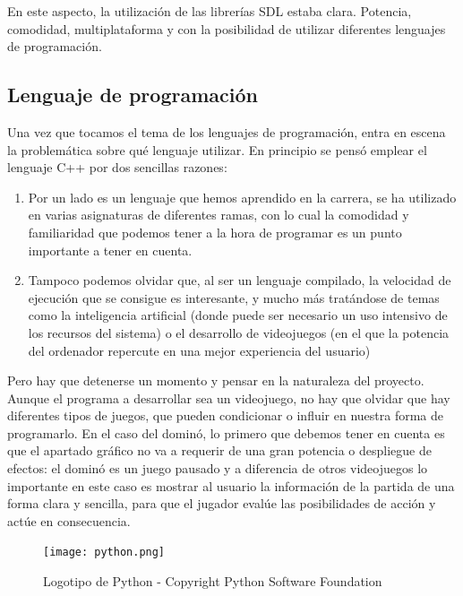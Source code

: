 En este aspecto, la utilización de las librerías SDL estaba clara. Potencia, comodidad, multiplataforma y con la posibilidad
de utilizar diferentes lenguajes de programación.\\

\subsection{Lenguaje de programación}

Una vez que tocamos el tema de los lenguajes de programación, entra en escena la problemática sobre qué lenguaje
utilizar. En principio se pensó emplear el lenguaje C++ por dos sencillas razones:

\begin{enumerate}
    \item Por un lado es un lenguaje que hemos aprendido en la carrera, se ha utilizado en varias asignaturas de
            diferentes ramas, con lo cual la comodidad y familiaridad que podemos tener a la hora de programar
            es un punto importante a tener en cuenta.
    \item Tampoco podemos olvidar que, al ser un lenguaje compilado, la velocidad de ejecución que se consigue
            es interesante, y mucho más tratándose de temas como la inteligencia artificial (donde puede ser
            necesario un uso intensivo de los recursos del sistema) o el desarrollo de videojuegos (en el que
            la potencia del ordenador repercute en una mejor experiencia del usuario)
\end{enumerate}

Pero hay que detenerse un momento y pensar en la naturaleza del proyecto. Aunque el programa a desarrollar sea un
videojuego, no hay que olvidar que hay diferentes tipos de juegos, que pueden condicionar o influir en nuestra forma
de programarlo. En el caso del dominó, lo primero que debemos tener en cuenta es que el apartado gráfico no va a
requerir de una gran potencia o despliegue de efectos: el dominó es un juego pausado y a diferencia de otros
videojuegos lo importante en este caso es mostrar al usuario la información de la partida de una forma clara y sencilla,
para que el jugador evalúe las posibilidades de acción y actúe en consecuencia.\\

\begin{figure}[h]
  \label{logo-python}
  \begin{center}
    \texttt{[image: python.png]}
  \end{center}
  \caption{Logotipo de Python - Copyright Python Software Foundation}
\end{figure}


